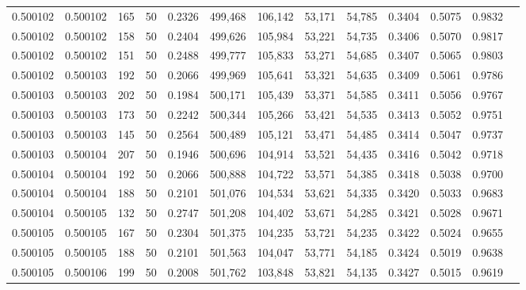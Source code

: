 \begin{tabular}{rrrrrrrrrrrrr}
0.500102 & 0.500102 &   165 &  50 &                                     0.2326 & 499,468 & 106,142 &  53,171 &  54,785 & 0.3404 & 0.5075 & 0.9832 \\
0.500102 & 0.500102 &   158 &  50 &                                     0.2404 & 499,626 & 105,984 &  53,221 &  54,735 & 0.3406 & 0.5070 & 0.9817 \\
0.500102 & 0.500102 &   151 &  50 &                                     0.2488 & 499,777 & 105,833 &  53,271 &  54,685 & 0.3407 & 0.5065 & 0.9803 \\
0.500102 & 0.500103 &   192 &  50 &                                     0.2066 & 499,969 & 105,641 &  53,321 &  54,635 & 0.3409 & 0.5061 & 0.9786 \\
0.500103 & 0.500103 &   202 &  50 &                                     0.1984 & 500,171 & 105,439 &  53,371 &  54,585 & 0.3411 & 0.5056 & 0.9767 \\
0.500103 & 0.500103 &   173 &  50 &                                     0.2242 & 500,344 & 105,266 &  53,421 &  54,535 & 0.3413 & 0.5052 & 0.9751 \\
0.500103 & 0.500103 &   145 &  50 &                                     0.2564 & 500,489 & 105,121 &  53,471 &  54,485 & 0.3414 & 0.5047 & 0.9737 \\
0.500103 & 0.500104 &   207 &  50 &                                     0.1946 & 500,696 & 104,914 &  53,521 &  54,435 & 0.3416 & 0.5042 & 0.9718 \\
0.500104 & 0.500104 &   192 &  50 &                                     0.2066 & 500,888 & 104,722 &  53,571 &  54,385 & 0.3418 & 0.5038 & 0.9700 \\
0.500104 & 0.500104 &   188 &  50 &                                     0.2101 & 501,076 & 104,534 &  53,621 &  54,335 & 0.3420 & 0.5033 & 0.9683 \\
0.500104 & 0.500105 &   132 &  50 &                                     0.2747 & 501,208 & 104,402 &  53,671 &  54,285 & 0.3421 & 0.5028 & 0.9671 \\
0.500105 & 0.500105 &   167 &  50 &                                     0.2304 & 501,375 & 104,235 &  53,721 &  54,235 & 0.3422 & 0.5024 & 0.9655 \\
0.500105 & 0.500105 &   188 &  50 &                                     0.2101 & 501,563 & 104,047 &  53,771 &  54,185 & 0.3424 & 0.5019 & 0.9638 \\
0.500105 & 0.500106 &   199 &  50 &                                     0.2008 & 501,762 & 103,848 &  53,821 &  54,135 & 0.3427 & 0.5015 & 0.9619 \\

\end{tabular}
